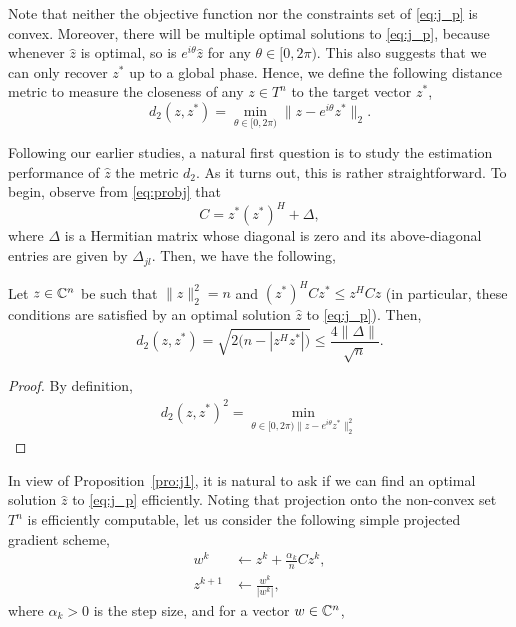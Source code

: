 Note that neither the objective function nor the constraints set of
\eqref{eq:j_p} is convex.
Moreover,
there will be multiple optimal solutions to \eqref{eq:j_p},
because whenever $\hat z$ is optimal,
so is $e^{i\theta}\hat z$ for any $\theta\in[0,2\pi)$.
This also suggests that we can only recover $z^*$ up to a global phase.
Hence,
we define the following distance metric to measure the closeness of
any $z\in T^n$ to the target vector $z^*$,
\begin{equation}
    d_2(z,z^*)=\min_{\theta\in[0,2\pi)}\|z-e^{i\theta}z^*\|_2.
\end{equation}

Following our earlier studies,
a natural first question is to study the estimation performance of $\hat z$
\wrt the metric $d_2$.
As it turns out,
this is rather straightforward.
To begin,
observe from \eqref{eq:probj} that
\begin{equation}
    C=z^*(z^*)^H+\Delta,
\end{equation}
where $\Delta$ is a Hermitian matrix whose diagonal is zero
and its above-diagonal entries are given by $\Delta_{jl}$.
Then,
we have the following,
\begin{pro}\label{pro:j1}
Let $z\in{\mathbb{C}}^n$ be such that $\|z\|_2^2=n$ and $(z^*)^HCz^*\le z^HCz$
(in particular,
these conditions are satisfied by an optimal solution
$\hat z$ to \eqref{eq:j_p}).
Then,
\begin{equation}
    d_2(z,z^*) = \sqrt{2\big(n-|z^Hz^*|\big)}\le\frac{4\|\Delta\|}{\sqrt{n}}.
\end{equation}
\end{pro}
\begin{proof}
By definition,
\begin{equation}
\begin{split}
    d_2(z,z^*)^2=\min_{\theta\in[0,2\pi)\|z-e^{i\theta}z^*\|_2^2}
\end{split}
\end{equation}
\end{proof}

In view of Proposition~\ref{pro:j1},
it is natural to ask if we can find an optimal solution $\hat z$
to \eqref{eq:j_p} efficiently.
Noting that projection onto the non-convex set $T^n$ is efficiently computable,
let us consider the following simple projected gradient scheme,
\begin{equation}
\begin{split}
    w^k &\leftarrow z^k + \frac{\alpha_k}{n}Cz^k, \\
    z^{k+1}&\leftarrow \frac{w^k}{|w^k|},
\end{split}
\end{equation}
where $\alpha_k>0$ is the step size,
and for a vector $w\in{\mathbb{C}}^n$,
\todo
